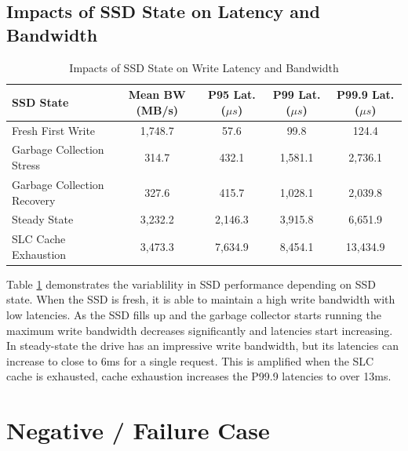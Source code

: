 \documentclass[11pt]{article}
\begin{document}
\subsection{Impacts of SSD State on Latency and Bandwidth}

\begin{table}[H]
	\centering
	\caption{Impacts of SSD State on Write Latency and Bandwidth}
	\label{tab:ssd-state-latency-bandwidth}
	\begin{tabular}{@{}lcccc@{}}
		\toprule
		SSD State                   & Mean BW (MB/s) & P95 Lat. ($\mu s$) & P99 Lat. ($\mu s$) & P99.9 Lat. ($\mu s$) \\
		\midrule
		Fresh First Write           & 1,748.7        & 57.6               & 99.8               & 124.4                \\
		Garbage Collection Stress   & 314.7          & 432.1              & 1,581.1            & 2,736.1              \\
		Garbage Collection Recovery & 327.6          & 415.7              & 1,028.1            & 2,039.8              \\
		Steady State                & 3,232.2        & 2,146.3            & 3,915.8            & 6,651.9              \\
		SLC Cache Exhaustion        & 3,473.3        & 7,634.9            & 8,454.1            & 13,434.9             \\
		\bottomrule
	\end{tabular}
\end{table}

Table \ref{tab:ssd-state-latency-bandwidth} demonstrates the variablility in SSD performance depending on SSD state.
When the SSD is fresh, it is able to maintain a high write bandwidth with low latencies. As the SSD fills up and the
garbage collector starts running the maximum write bandwidth decreases significantly and latencies start increasing. In
steady-state the drive has an impressive write bandwidth, but its latencies can increase to close to 6ms for a single
request. This is amplified when the SLC cache is exhausted, cache exhaustion increases the P99.9 latencies to over
13ms.

\section{Negative / Failure Case}
\end{document}
